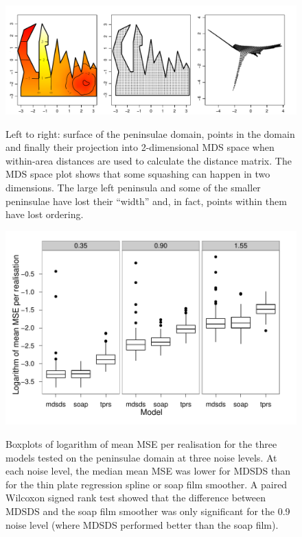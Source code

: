 \documentclass[useAMS, referee]{biom}
\begin{document}

\begin{figure}
\centering
\includegraphics[width=\textwidth]{examples/wt2/wt2-plot.pdf} \\
\caption{Left to right: surface of the peninsulae domain, points in the domain and finally their projection into 2-dimensional MDS space when within-area distances are used to calculate the distance matrix. The MDS space plot shows that some squashing can happen in two dimensions. The large left peninsula and some of the smaller peninsulae have lost their ``width'' and, in fact, points within them have lost ordering.}
\label{wt2-plot}
\end{figure}


\begin{figure}
\centering
\includegraphics{examples/wt2/wt2-result.pdf} \\
\caption{Boxplots of logarithm of mean MSE per realisation for the three models tested on the peninsulae domain at three noise levels. At each noise level, the median mean MSE was lower for MDSDS than for the thin plate regression spline or soap film smoother. A paired Wilcoxon signed rank test showed that the difference between MDSDS and the soap film smoother was only significant for the 0.9 noise level (where MDSDS performed better than the soap film).}
\label{wt2-boxplots}
\end{figure}
\end{document}

